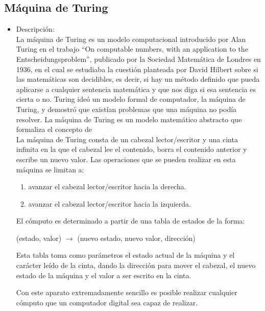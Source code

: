 \documentclass[12pt,a4paper,spanish]{book}
\begin{document}
\subsection{M\'aquina de Turing}
\begin{itemize}
\item Descripci\'on:\\
\newline
La m\'aquina de Turing es un modelo computacional introducido por Alan Turing en el trabajo ``On computable numbers, with an application to the Entscheidungsproblem'', publicado por la Sociedad Matem\'atica de Londres en 1936, en el cual se estudiaba la cuesti\'on planteada por David Hilbert sobre si las matem\'aticas son decidibles, es decir, si hay un m\'etodo definido que pueda aplicarse a cualquier sentencia matem\'atica y que nos diga si esa sentencia es cierta o no. Turing ide\'o un modelo formal de computador, la m\'aquina de Turing, y demostr\'o que exist\'ian problemas que una m\'aquina no pod\'ia resolver. La m\'aquina de Turing es un modelo matem\'atico abstracto que formaliza el concepto de \\

La m\'aquina de Turing consta de un cabezal lector/escritor y una cinta infinita en la que el cabezal lee el contenido, borra el contenido anterior y escribe un nuevo valor. Las operaciones que se pueden realizar en esta m\'aquina se limitan a:
\begin{center}
\begin{enumerate}
\item avanzar el cabezal lector/escritor hacia la derecha.
\item avanzar el cabezal lector/escritor hacia la izquierda.
\end{enumerate}
\end{center}
El c\'omputo es determinado a partir de una tabla de estados de la forma:
\begin{center}
(estado, valor) $\rightarrow$ (nuevo estado, nuevo valor, direcci\'on)\\
\end{center}
Esta tabla toma como par\'ametros el estado actual de la m\'aquina y el car\'acter le\'ido de la cinta, dando la direcci\'on para mover el cabezal, el nuevo estado de la m\'aquina y el valor a ser escrito en la cinta.

Con este aparato extremadamente sencillo es posible realizar cualquier c\'omputo que un computador digital sea capaz de realizar.


\end{itemize}
\end{document}
